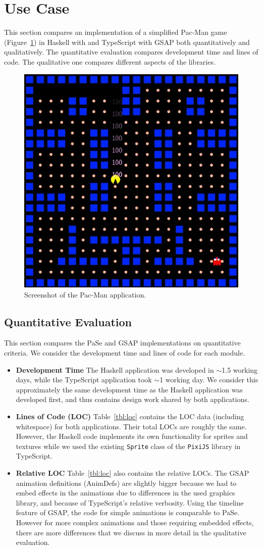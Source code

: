 \section{Use Case}

This section compares an implementation of a simplified Pac-Man game (Figure~\ref{fig:pacman}) in Haskell
with \dsl{} and TypeScript with GSAP both quantitatively and qualitatively. The
quantitative evaluation compares development time and lines
of code. The qualitative one compares different aspects of the 
libraries.

\begin{figure}[h]{\textwidth}
\centering
\includegraphics[width=.3\textwidth]{pictures/pacman}
\caption{Screenshot of the Pac-Man application.}
\label{fig:pacman}
\end{figure}

\subsection{Quantitative Evaluation}

This section compares the PaSe and GSAP implementations on
quantitative criteria. We consider the development time and lines of code for
each module.

\begin{itemize}
\item \textbf{Development Time} The Haskell application was developed in
$\sim$1.5 working days, while the TypeScript application took $\sim$1 working
day. We consider this approximately the same development time as the Haskell application
was developed first, and thus contains design work shared by both
applications.
\item \textbf{Lines of Code (LOC)} Table~\ref{tbl:loc} contains the LOC data
(including whitespace) for both applications. Their total LOCs are roughly the same. However, the Haskell
code implements its own functionality for sprites and
textures while we used the existing
\texttt{Sprite} class of the \texttt{PixiJS} library in TypeScript.
\item \textbf{Relative LOC} Table~\ref{tbl:loc} also contains the relative
LOCs. The GSAP animation definitions (AnimDefs) are slightly bigger because
we had to embed effects in the animations due to differences
in the used graphics library, and because of TypeScript's relative verbosity.
Using the timeline feature of GSAP, the code for
simple animations is comparable to PaSe. However for more complex animations
and those requiring embedded effects, there are more differences that we
discuss in more detail in the qualitative evaluation.
\end{itemize}

